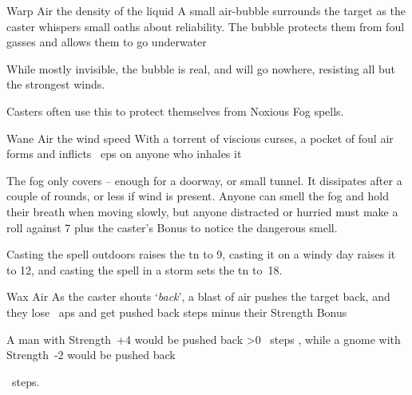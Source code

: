 \ifodd\value{diceNo}

  {}%
  {Warp}%
  {Air}%
  {the density of the liquid}%
  {A small air-bubble surrounds the target as the caster whispers small oaths about reliability.
  The bubble protects them from foul gasses and allows them to go underwater}%
  {While mostly invisible, the bubble is real, and will go nowhere, resisting all but the strongest winds.

    Casters often use this to protect themselves from Noxious Fog spells.}

  {}%
  {Wane}%
  {Air}%
  {the wind speed}%
  {With a torrent of viscious curses, a pocket of foul air forms and inflicts ~\glspl{ep} on anyone who inhales it}%
  {
    The fog only covers  -- enough for a doorway, or small tunnel.
    It dissipates after a couple of \glspl{round}, or less if wind is present.
    Anyone can smell the fog and hold their breath when moving slowly, but anyone distracted or hurried must make a  roll against 7 plus the caster's Bonus to notice the dangerous smell.

    Casting the spell outdoors raises the \gls{tn} to 9, casting it on a windy day raises it to 12, and casting the spell in a storm sets the \gls{tn} to~18.
  }

\else

  {}%
  {Wax}%
  {Air}%
  {}%
  {As the caster shouts `\textit{back}', a blast of air pushes the target back, and they lose ~\glspl{ap} and get pushed back  \glspl{step} minus their Strength Bonus}%
  {
  \begin{exampletext}
    \setcounter{track}{3}
    \addtocounter{track}{-\value{spellPlusTwo}}
    A man with Strength~+4 would be pushed back
    \ifnum\value{track}>0%
    ~\glspl{step}%
    \fi,
    while a gnome with Strength~-2 would be pushed back
    \setcounter{track}{-2}
    \addtocounter{track}{-\value{spellPlusTwo}}
    ~\glspl{step}.
  \end{exampletext}
  }

\fi
{}
